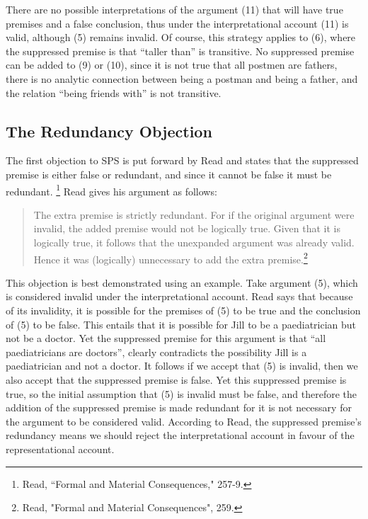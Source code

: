 \noindent There are no possible interpretations of the argument (11) that will
have true premises and a false conclusion, thus under the
interpretational account (11) is valid, although (5) remains invalid. Of
course, this strategy applies to (6), where the suppressed premise is
that ``taller than'' is transitive. No suppressed premise can be added
to (9) or (10), since it is not true that all postmen are fathers, there
is no analytic connection between being a postman and being a father,
and the relation ``being friends with'' is not transitive.

\subsection*{The Redundancy Objection}

The first objection to SPS is put forward by Read and states that the
suppressed premise is either false or redundant, and since it cannot be
false it must be redundant. \footnote{Read, ``Formal and Material
  Consequences," 257-9.} Read gives his argument as follows:

\begin{quote}
The extra premise is strictly redundant. For if the original argument
were invalid, the added premise would not be logically true. Given that
it is logically true, it follows that the unexpanded argument was
already valid. Hence it was (logically) unnecessary to add the extra
premise.\footnote{Read, "Formal and Material Consequences", 259.}
\end{quote}

\noindent This objection is best demonstrated using an example. Take argument (5),
which is considered invalid under the interpretational account. Read
says that because of its invalidity, it is possible for the premises of
(5) to be true and the conclusion of (5) to be false. This entails that
it is possible for Jill to be a paediatrician but not be a doctor. Yet
the suppressed premise for this argument is that ``all paediatricians
are doctors'', clearly contradicts the possibility Jill is a
paediatrician and not a doctor. It follows if we accept that (5) is
invalid, then we also accept that the suppressed premise is false. Yet
this suppressed premise is true, so the initial assumption that (5) is
invalid must be false, and therefore the addition of the suppressed
premise is made redundant for it is not necessary for the argument to be
considered valid. According to Read, the suppressed premise's redundancy
means we should reject the interpretational account in favour of the
representational account.

